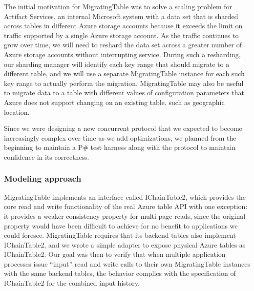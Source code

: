 \documentclass{sig-alternate}
\newcommand{\psharp}{P\#\xspace}
\begin{document}
The initial motivation for MigratingTable was to solve a scaling problem for Artifact Services, an internal Microsoft system with a data set that is sharded across tables in different Azure storage accounts because it exceeds the limit on traffic supported by a single Azure storage account.  As the traffic continues to grow over time, we will need to reshard the data set across a greater number of Azure storage accounts without interrupting service.  During such a resharding, our sharding manager will identify each key range that should migrate to a different table, and we will use a separate MigratingTable instance for each such key range to actually perform the migration.  MigratingTable may also be useful to migrate data to a table with different values of configuration parameters that Azure does not support changing on an existing table, such as geographic location.

Since we were designing a new concurrent protocol that we expected to become increasingly complex over time as we add optimizations, we planned from the beginning to maintain a \psharp test harness along with the protocol to maintain confidence in its correctness.

\subsubsection{Modeling approach}

MigratingTable implements an interface called IChainTable2, which provides the core read and write functionality of the real Azure table API with one exception: it provides a weaker consistency property for multi-page reads, since the original property would have been difficult to achieve for no benefit to applications we could foresee.  MigratingTable requires that its backend tables also implement IChainTable2, and we wrote a simple adapter to expose physical Azure tables as IChainTable2.  Our goal was then to verify that when multiple application processes issue ``input'' read and write calls to their own MigratingTable instances with the same backend tables, the behavior complies with the specification of IChainTable2 for the combined input history.
\end{document}

